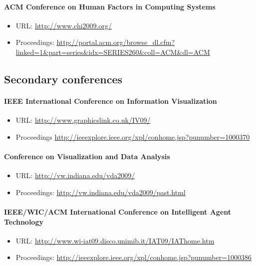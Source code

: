 \paragraph{ACM Conference on Human Factors in Computing Systems}
\begin{itemize}
  \item URL: \url{http://www.chi2009.org/}
  \item Proceedings: \url{http://portal.acm.org/browse_dl.cfm?linked=1&part=series&idx=SERIES260&coll=ACM&dl=ACM}
\end{itemize}

\subsection{Secondary conferences}
\paragraph{IEEE International Conference on Information Visualization}
\begin{itemize}
  \item URL: \url{http://www.graphicslink.co.uk/IV09/}
  \item Proceedings \url{http://ieeexplore.ieee.org/xpl/conhome.jsp?punumber=1000370}
\end{itemize}

\paragraph{Conference on Visualization and Data Analysis}
\begin{itemize}
	\item URL: \url{http://vw.indiana.edu/vda2009/}
	\item Proceedings: \url{http://vw.indiana.edu/vda2009/past.html}
\end{itemize}

\paragraph{IEEE/WIC/ACM International Conference on Intelligent Agent Technology}
\begin{itemize}
	\item URL: \url{http://www.wi-iat09.disco.unimib.it/IAT09/IAThome.htm}
	\item Proceedings: \url{http://ieeexplore.ieee.org/xpl/conhome.jsp?punumber=1000386}
\end{itemize}